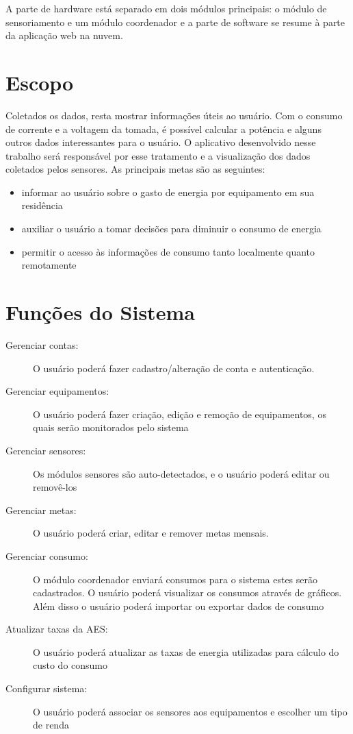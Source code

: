A parte de hardware está separado em dois módulos principais: o módulo de sensoriamento e um módulo coordenador e a parte de software se resume à parte da aplicação web na nuvem.

\section{Escopo}

Coletados os dados, resta mostrar informações úteis ao usuário. Com o consumo de corrente e a voltagem da tomada, é possível calcular a potência e alguns outros dados interessantes para o usuário. O aplicativo desenvolvido nesse trabalho será responsável por esse tratamento e a visualização dos dados coletados pelos sensores. As principais metas são as seguintes:

\begin{itemize}
	\item{informar ao usuário sobre o gasto de energia por equipamento em sua residência}
	\item{auxiliar o usuário a tomar decisões para diminuir o consumo de energia}
  \item{permitir o acesso às informações de consumo tanto localmente quanto remotamente}
\end{itemize}
%
\section{Funções do Sistema}

\begin{description}
	\item[Gerenciar contas:] O usuário poderá fazer cadastro/alteração de conta e autenticação.
	\item[Gerenciar equipamentos:] O usuário poderá fazer criação, edição e remoção de equipamentos, os quais serão monitorados pelo sistema
	\item[Gerenciar sensores:] Os módulos sensores são auto-detectados, e o usuário poderá editar ou removê-los
	\item[Gerenciar metas:] O usuário poderá criar, editar e remover metas mensais.
	\item[Gerenciar consumo:] O módulo coordenador enviará consumos para o sistema estes serão cadastrados. O usuário poderá visualizar os consumos através de gráficos. Além disso o usuário poderá importar ou exportar dados de consumo
	\item[Atualizar taxas da AES:] O usuário poderá atualizar as taxas de energia utilizadas para cálculo do custo do consumo
	\item[Configurar sistema:] O usuário poderá associar os sensores aos equipamentos e escolher um tipo de renda
\end{description}

